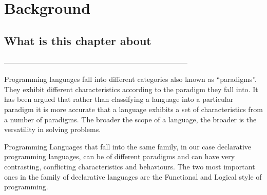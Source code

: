 \documentclass[thesis-solanki.tex]{subfiles}
\begin{document}
\chapter{Background}\label{chap:background}

\section{What is this chapter about}

-----------------------------------------------------------------------------

Programming languages fall into different categories also known as ``paradigms''.
They exhibit different characteristics according to the paradigm they fall into.
It has been argued \cite{Krishnamurthi:2008:TPL:1480828.1480846} that
rather than classifying a language into a particular paradigm
it is
more accurate that a language exhibits a set of characteristics from a
number of paradigms.
The broader the scope of a language, the broader is the versatility in solving problems.

Programming Languages that fall into the same family, in our case declarative programming languages, can be of
different paradigms and can have very contrasting, conflicting characteristics and behaviours.
The two most important ones in the family of declarative languages are the Functional and Logical style of
programming.
\end{document}
